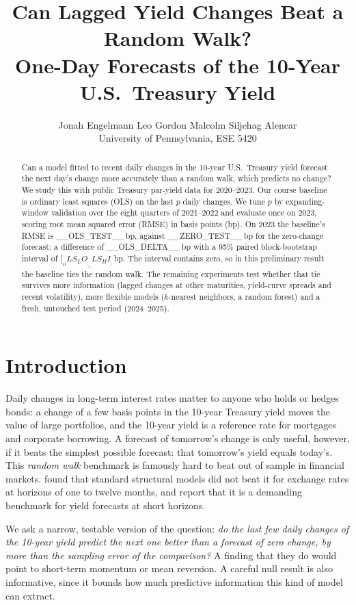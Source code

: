 \documentclass{article}
\title{Can Lagged Yield Changes Beat a Random Walk?\\
One-Day Forecasts of the 10-Year U.S.\ Treasury Yield}
\author{%
  Jonah Engelmann \qquad Leo Gordon \qquad Malcolm Siljehag Alencar \\
  \textmd{University of Pennsylvania, ESE 5420}
}
\begin{document}
\maketitle

\begin{abstract}
Can a model fitted to recent daily changes in the 10-year U.S.\ Treasury yield forecast the next day's change more accurately than a random walk, which predicts no change? We study this with public Treasury par-yield data for 2020--2023. Our course baseline is ordinary least squares (OLS) on the last $p$ daily changes. We tune $p$ by expanding-window validation over the eight quarters of 2021--2022 and evaluate once on 2023, scoring root mean squared error (RMSE) in basis points (bp). On 2023 the baseline's RMSE is __OLS_TEST__\,bp, against __ZERO_TEST__\,bp for the zero-change forecast: a difference of __OLS_DELTA__\,bp with a 95\% paired block-bootstrap interval of $[__OLS_LO__, __OLS_HI__]$\,bp. The interval contains zero, so in this preliminary result the baseline ties the random walk. The remaining experiments test whether that tie survives more information (lagged changes at other maturities, yield-curve spreads and recent volatility), more flexible models ($k$-nearest neighbors, a random forest) and a fresh, untouched test period (2024--2025).
\end{abstract}

\section{Introduction}
Daily changes in long-term interest rates matter to anyone who holds or hedges bonds: a change of a few basis points in the 10-year Treasury yield moves the value of large portfolios, and the 10-year yield is a reference rate for mortgages and corporate borrowing. A forecast of tomorrow's change is only useful, however, if it beats the simplest possible forecast: that tomorrow's yield equals today's. This \emph{random walk} benchmark is famously hard to beat out of sample in financial markets. \citet{meese1983} found that standard structural models did not beat it for exchange rates at horizons of one to twelve months, and \citet{diebold2006} report that it is a demanding benchmark for yield forecasts at short horizons.

We ask a narrow, testable version of the question: \emph{do the last few daily changes of the 10-year yield predict the next one better than a forecast of zero change, by more than the sampling error of the comparison?} A finding that they do would point to short-term momentum or mean reversion. A careful null result is also informative, since it bounds how much predictive information this kind of model can extract.
\end{document}
